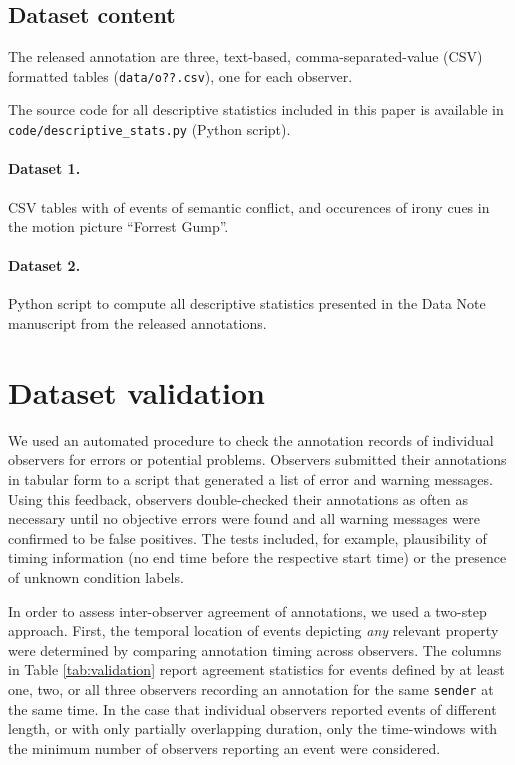 \documentclass[10pt,a4paper]{article}
\begin{document}
\subsection*{Dataset content}

The released annotation are three, text-based, comma-separated-value (CSV)
formatted tables (\texttt{data/o??.csv}), one for each observer.

The source code for all descriptive statistics included in this paper is
available in \texttt{code/descriptive\_stats.py} (Python script).

\paragraph{Dataset 1.}
CSV tables with of events of semantic conflict, and occurences of irony cues
in the motion picture “Forrest Gump”.

\paragraph{Dataset 2.}
Python script to compute all descriptive statistics presented in the
Data Note manuscript from the released annotations.

\section*{Dataset validation}



We used an automated procedure to check the annotation records of individual
observers for errors or potential problems. Observers submitted their
annotations in tabular form to a script that generated a list of error and
warning messages. Using this feedback, observers double-checked their
annotations as often as necessary until no objective errors were found and all
warning messages were confirmed to be false positives. The tests included, for
example, plausibility of timing information (no end time before the respective
start time) or the presence of unknown condition labels.

In order to assess inter-observer agreement of annotations, we used a two-step
approach. First, the temporal location of events depicting \textit{any}
relevant property were determined by comparing annotation timing across
observers. The columns in Table \ref{tab:validation} report agreement
statistics for events defined by at least one, two, or all three observers
recording an annotation for the same \texttt{sender} at the same time. In the
case that individual observers reported events of different length, or with
only partially overlapping duration, only the time-windows with the minimum
number of observers reporting an event were considered.
\end{document}
